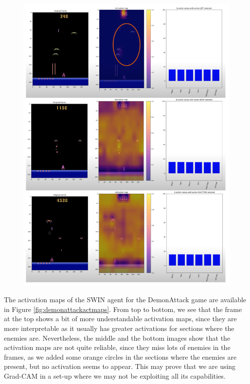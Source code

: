\begin{figure}[!h]
	\centering
	\includegraphics[width=0.7\linewidth]{figures/demonattack_act_maps_vit}
	\caption{}
	\label{fig:demonattackactmapsvit}
\end{figure}

The activation maps of the SWIN agent for the DemonAttack game are available in Figure \ref{fig:demonattackactmaps}. From top to bottom, we see that the frame at the top shows a bit of more understandable activation maps, since they are more interpretable as it usually has greater activations for sections where the enemies are. Nevertheless, the middle and the bottom images show that the activation maps are not quite reliable, since they miss lots of enemies in the frames, as we added some orange circles in the sections where the enemies are present, but no activation seems to appear. This may prove that we are using Grad-CAM in a set-up where we may not be exploiting all its capabilities.

